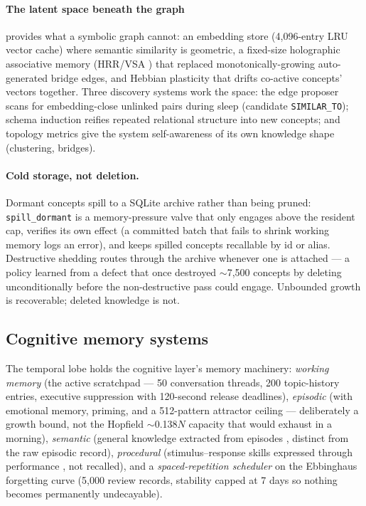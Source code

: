 \documentclass[11pt]{article}
\newcommand{\code}[1]{\texttt{\small #1}}
\begin{document}
\paragraph{The latent space beneath the graph} provides what a symbolic
graph cannot: an embedding store (4{,}096-entry LRU vector cache) where
semantic similarity is geometric, a fixed-size holographic associative
memory (HRR/VSA \cite{plate,kanerva}) that replaced monotonically-growing auto-generated
bridge edges, and Hebbian plasticity \cite{hebb} that drifts co-active concepts'
vectors together. Three discovery systems work the space: the edge
proposer scans for embedding-close unlinked pairs during sleep
(candidate \code{SIMILAR\_TO}); schema induction reifies repeated
relational structure into new concepts; and topology metrics give the
system self-awareness of its own knowledge shape (clustering, bridges).

\paragraph{Cold storage, not deletion.} Dormant concepts spill to a
SQLite archive rather than being pruned: \code{spill\_dormant} is a
memory-pressure valve that only engages above the resident cap, verifies
its own effect (a committed batch that fails to shrink working memory
logs an error), and keeps spilled concepts recallable by id or alias.
Destructive shedding routes through the archive whenever one is
attached --- a policy learned from a defect that once destroyed
$\sim$7{,}500 concepts by deleting unconditionally before the
non-destructive pass could engage. Unbounded growth is recoverable;
deleted knowledge is not.

\subsection{Cognitive memory systems}

The temporal lobe holds the cognitive layer's memory machinery:
\emph{working memory} (the active scratchpad --- 50 conversation
threads, 200 topic-history entries, executive suppression with
120-second release deadlines), \emph{episodic} (with emotional memory,
priming, and a 512-pattern attractor ceiling --- deliberately a growth
bound, not the Hopfield $\sim$0.138$N$ capacity that would exhaust in a
morning), \emph{semantic} (general knowledge extracted from episodes \cite{tulving},
distinct from the raw episodic record), \emph{procedural}
(stimulus--response skills expressed through performance \cite{squire},
not recalled),
and a \emph{spaced-repetition scheduler} on the Ebbinghaus forgetting
curve \cite{ebbinghaus} (5{,}000 review records, stability capped at 7 days so nothing
becomes permanently undecayable).
\end{document}

